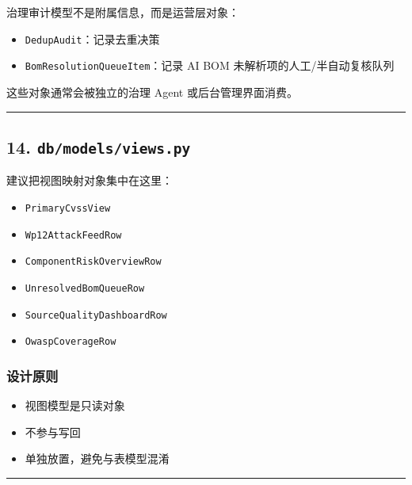 \documentclass[UTF8]{ctexart}
\providecommand{\tightlist}{%
  \setlength{\itemsep}{0pt}\setlength{\parskip}{0pt}}
\begin{document}
治理审计模型不是附属信息，而是运营层对象：

\begin{itemize}
\tightlist
\item
  \texttt{DedupAudit}：记录去重决策
\item
  \texttt{BomResolutionQueueItem}：记录 AI BOM
  未解析项的人工/半自动复核队列
\end{itemize}

这些对象通常会被独立的治理 Agent 或后台管理界面消费。

\begin{center}\rule{0.5\linewidth}{0.5pt}\end{center}

\hypertarget{dbmodelsviews.py}{%
\subsection{\texorpdfstring{14.
\texttt{db/models/views.py}}{14. db/models/views.py}}\label{dbmodelsviews.py}}

建议把视图映射对象集中在这里：

\begin{itemize}
\tightlist
\item
  \texttt{PrimaryCvssView}
\item
  \texttt{Wp12AttackFeedRow}
\item
  \texttt{ComponentRiskOverviewRow}
\item
  \texttt{UnresolvedBomQueueRow}
\item
  \texttt{SourceQualityDashboardRow}
\item
  \texttt{OwaspCoverageRow}
\end{itemize}

\hypertarget{ux8bbeux8ba1ux539fux5219-2}{%
\subsubsection{设计原则}\label{ux8bbeux8ba1ux539fux5219-2}}

\begin{itemize}
\tightlist
\item
  视图模型是只读对象
\item
  不参与写回
\item
  单独放置，避免与表模型混淆
\end{itemize}

\begin{center}\rule{0.5\linewidth}{0.5pt}\end{center}
\end{document}
